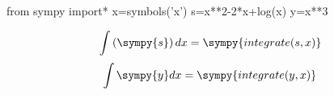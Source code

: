 \documentclass[a4paper,10pt]{article}
\begin{document}
\begin{sympycode}
from sympy import*
x=symbols('x')
s=x**2-2*x+log(x)
y=x**3
\end{sympycode}

\[ \int\left(\sympy{s}\right)dx=\sympy{integrate(s,x)} \]
\[ \int{\sympy{y}dx}=\sympy{integrate(y,x)} \]
\end{document}
